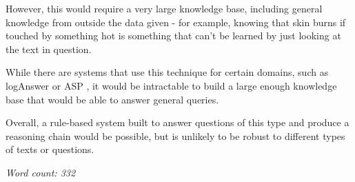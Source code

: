 \documentclass[12pt,a4paper]{article}
\begin{document}
However, this would require a very large knowledge base, including general knowledge from outside the data given - for example, knowing that skin burns if touched by something hot is something that can't be learned by just looking at the text in question.

While there are systems that use this technique for certain domains, such as logAnswer \cite{furbach2008loganswer} or ASP \cite{ASP}, it would be intractable to build a large enough knowledge base that would be able to answer general queries.

Overall, a rule-based system built to answer questions of this type and produce a reasoning chain would be possible, but is unlikely to be robust to different types of texts or questions.

\textit{Word count: 332}


\end{document}
